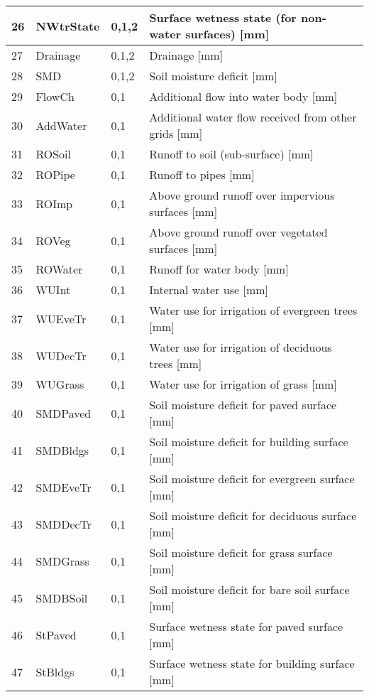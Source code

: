 \documentclass[letterpaper,10pt,english]{sphinxmanual}
\begin{document}
\begin{savenotes}
\begin{longtable}{|l|l|l|l|}
\\
\hline
26
&
NWtrState
&
0,1,2
&
Surface wetness state (for non-water surfaces) {[}mm{]}
\\
\hline
27
&
Drainage
&
0,1,2
&
Drainage {[}mm{]}
\\
\hline
28
&
SMD
&
0,1,2
&
Soil moisture deficit {[}mm{]}
\\
\hline
29
&
FlowCh
&
0,1
&
Additional flow into water body {[}mm{]}
\\
\hline
30
&
AddWater
&
0,1
&
Additional water flow received from other grids {[}mm{]}
\\
\hline
31
&
ROSoil
&
0,1
&
Runoff to soil (sub-surface) {[}mm{]}
\\
\hline
32
&
ROPipe
&
0,1
&
Runoff to pipes {[}mm{]}
\\
\hline
33
&
ROImp
&
0,1
&
Above ground runoff over impervious surfaces {[}mm{]}
\\
\hline
34
&
ROVeg
&
0,1
&
Above ground runoff over vegetated surfaces {[}mm{]}
\\
\hline
35
&
ROWater
&
0,1
&
Runoff for water body {[}mm{]}
\\
\hline
36
&
WUInt
&
0,1
&
Internal water use {[}mm{]}
\\
\hline
37
&
WUEveTr
&
0,1
&
Water use for irrigation of evergreen trees {[}mm{]}
\\
\hline
38
&
WUDecTr
&
0,1
&
Water use for irrigation of deciduous trees {[}mm{]}
\\
\hline
39
&
WUGrass
&
0,1
&
Water use for irrigation of grass {[}mm{]}
\\
\hline
40
&
SMDPaved
&
0,1
&
Soil moisture deficit for paved surface {[}mm{]}
\\
\hline
41
&
SMDBldgs
&
0,1
&
Soil moisture deficit for building surface {[}mm{]}
\\
\hline
42
&
SMDEveTr
&
0,1
&
Soil moisture deficit for evergreen surface {[}mm{]}
\\
\hline
43
&
SMDDecTr
&
0,1
&
Soil moisture deficit for deciduous surface {[}mm{]}
\\
\hline
44
&
SMDGrass
&
0,1
&
Soil moisture deficit for grass surface {[}mm{]}
\\
\hline
45
&
SMDBSoil
&
0,1
&
Soil moisture deficit for bare soil surface {[}mm{]}
\\
\hline
46
&
StPaved
&
0,1
&
Surface wetness state for paved surface {[}mm{]}
\\
\hline
47
&
StBldgs
&
0,1
&
Surface wetness state for building surface {[}mm{]}
\\
\hline

\end{longtable}
\end{savenotes}
\end{document}
